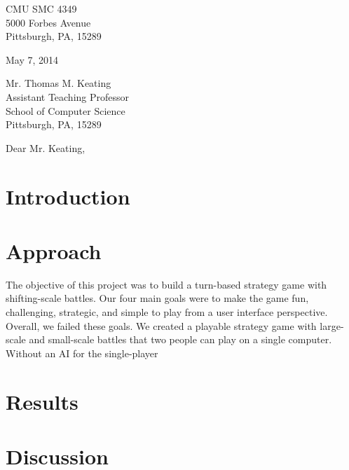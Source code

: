 \documentclass{article}
\begin{document}
\noindent
CMU SMC 4349\\
5000 Forbes Avenue\\
Pittsburgh, PA, 15289

\vspace{1em}

\noindent
May 7, 2014

\vspace{1em}

\noindent
Mr. Thomas M. Keating\\
Assistant Teaching Professor\\
School of Computer Science\\
Pittsburgh, PA, 15289

\vspace{1em}

\noindent
Dear Mr. Keating,


\vspace{1em}



\tableofcontents

\section{Introduction}

\section{Approach}
The objective of this project was to build a turn-based strategy game with shifting-scale battles.
Our four main goals were to make the game fun, challenging, strategic, and simple to play from a user interface perspective.
Overall, we failed these goals.
We created a playable strategy game with large-scale and small-scale battles that two people can play on a single computer.
Without an AI for the single-player

\section{Results}

\section{Discussion}

\end{document}
